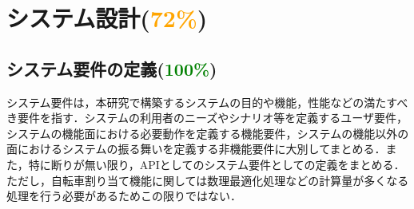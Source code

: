 \section{システム設計(\textcolor{orange}{72\%})}
  \label{sec:システム設計}
    \par
  
  \subsection{システム要件の定義(\textcolor{green}{100\%})}
    \label{sec:システム要件の定義}
      \par システム要件は，本研究で構築するシステムの目的や機能，性能などの満たすべき要件を指す．システムの利用者のニーズやシナリオ等を定義するユーザ要件，システムの機能面における必要動作を定義する機能要件，システムの機能以外の面におけるシステムの振る舞いを定義する非機能要件に大別してまとめる．また，特に断りが無い限り，APIとしてのシステム要件としての定義をまとめる．ただし，自転車割り当て機能に関しては数理最適化処理などの計算量が多くなる処理を行う必要があるためこの限りではない．

